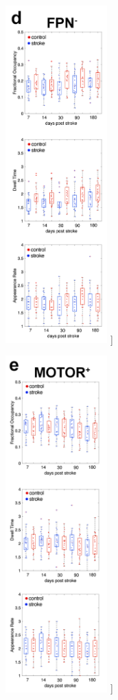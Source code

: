 \documentclass[phd,tocprelim]{cornell}
\renewcommand{\caption}[1]{\singlespacing\hangcaption{#1}\normalspacing}
\begin{document}
\begin{figure}[h!]
		\ContinuedFloat
		\captionsetup{labelformat=adja-page}
    \centering
    \includegraphics[width=0.35\textwidth]{chapter2/SupplementaryFig11d.png}
    \caption[]{}
\end{figure}
\null
\vfill
\clearpage
\null
\vfill
\begin{figure}[h!]
		\ContinuedFloat
		\captionsetup{labelformat=adja-page}
    \centering
    \includegraphics[width=0.35\textwidth]{chapter2/SupplementaryFig11e.png}
    \caption[]{}
\end{figure}
\end{document}

